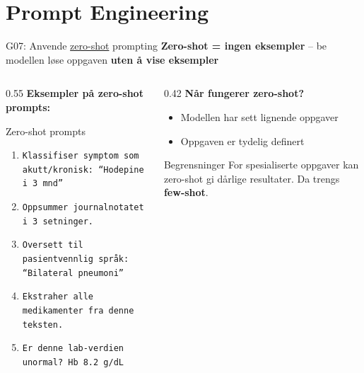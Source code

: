 \documentclass[aspectratio=169, 10pt]{beamer}
\begin{document}
\section{Prompt Engineering}

\begin{frame}{G07: Anvende \href{https://en.wikipedia.org/wiki/Zero-shot_learning}{zero-shot} prompting}
    \textbf{Zero-shot = ingen eksempler} -- be modellen løse oppgaven \textbf{uten å vise eksempler}

    \vspace{0.1cm}
    \begin{columns}[T]
        \begin{column}{0.55\textwidth}
            \textbf{Eksempler på zero-shot prompts:}
            \begin{block}{\footnotesize Zero-shot prompts}
                \scriptsize
                \begin{enumerate}
                    \item \texttt{Klassifiser symptom som akutt/kronisk: ``Hodepine i 3 mnd''}
                    \item \texttt{Oppsummer journalnotatet i 3 setninger.}
                    \item \texttt{Oversett til pasientvennlig språk: ``Bilateral pneumoni''}
                    \item \texttt{Ekstraher alle medikamenter fra denne teksten.}
                    \item \texttt{Er denne lab-verdien unormal? Hb 8.2 g/dL}
                \end{enumerate}
            \end{block}
        \end{column}
        \begin{column}{0.42\textwidth}
            \textbf{Når fungerer zero-shot?}
            \footnotesize
            \begin{itemize}
                \item Modellen har sett lignende oppgaver
                \item Oppgaven er tydelig definert
            \end{itemize}

            \vspace{0.1cm}
            \begin{alertblock}{\footnotesize Begrensninger}
                \scriptsize
                For spesialiserte oppgaver kan zero-shot gi dårlige resultater. Da trengs \textbf{few-shot}.
            \end{alertblock}
        \end{column}
    \end{columns}
\end{frame}
\end{document}
